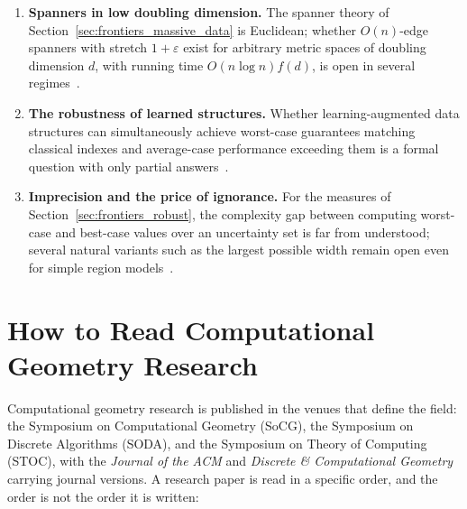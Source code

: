 \begin{enumerate}
\item \textbf{Spanners in low doubling dimension.} The spanner theory of
  Section~\ref{sec:frontiers_massive_data} is Euclidean; whether $O(n)$-edge
  spanners with stretch $1+\varepsilon$ exist for arbitrary metric spaces of
  doubling dimension $d$, with running time $O(n \log n) f(d)$, is open in
  several regimes~\cite{smid2007}.

\item \textbf{The robustness of learned structures.} Whether
  learning-augmented data structures can simultaneously achieve worst-case
  guarantees matching classical indexes and average-case performance exceeding
  them is a formal question with only partial answers~\cite{kraska2018,mitzenmacher2022}.

\item \textbf{Imprecision and the price of ignorance.} For the measures of
  Section~\ref{sec:frontiers_robust}, the complexity gap between computing
  worst-case and best-case values over an uncertainty set is far from
  understood; several natural variants such as the largest possible width remain
  open even for simple region models~\cite{loffler2010largest,loffler2010hulls}.
\end{enumerate}

\section{How to Read Computational Geometry Research}
\label{sec:frontiers_reading}

Computational geometry research is published in the
venues that define the field: the Symposium on Computational Geometry (SoCG),
the Symposium on Discrete Algorithms (SODA), and the Symposium on Theory of
Computing (STOC), with the \emph{Journal of the ACM} and \emph{Discrete \&
Computational Geometry} carrying journal versions. A research paper is read in
a specific order, and the order is not the order it is written:

